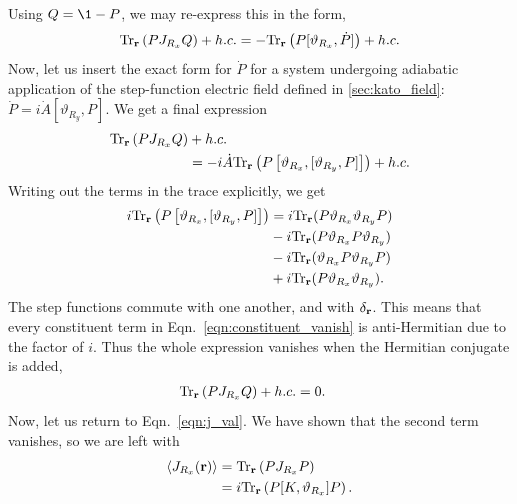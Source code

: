 Using $Q = \1-P$, we may re-express this in the form,
\begin{align}
    \textup{Tr} _{\textbf r} \left ( P J_{R_x}Q  \right ) + h.c. = 
    - \textup{Tr} _{\textbf r} 
    \left ( P  
    [ \vartheta_{R_x},\dot P]
    \right ) 
    + h.c.
\end{align}
Now, let us insert the exact form for $\dot P$ for a system undergoing adiabatic application of the step-function electric field defined in \textsection\ref{sec:kato_field}: $\dot P = i\dot A [\vartheta_{R_y} , P]$. We get a final expression
\begin{align}\label{eqn:constituent_vanish}
\begin{aligned}
    \textup{Tr} _{\textbf r} \left ( P J_{R_x}Q  \right ) &+ h.c.\\ &=- i \dot A \textup{Tr} _{\textbf r} 
    \left ( P  
    \left [ \vartheta_{R_x},[\vartheta_{R_y}, P]\right ]
    \right ) + h.c.
\end{aligned}
\end{align}
Writing out the terms in the trace explicitly, we get
\begin{align}
\begin{aligned}
    i\textup{Tr} _{\textbf r} 
    \left ( P  
    \left [ \vartheta_{R_x},[\vartheta_{R_y}, P]\right ]
    \right ) &= i\textup{Tr}_{\textbf{r}} (P\vartheta_{R_x}\vartheta_{R_y}P )\\
    &- i\textup{Tr}_{\textbf{r}} (P\vartheta_{R_x}P\vartheta_{R_y})\\
    &- i\textup{Tr}_{\textbf{r}} (\vartheta_{R_x}P\vartheta_{R_y}P)\\
    &+ i\textup{Tr}_{\textbf{r}} (P\vartheta_{R_x}\vartheta_{R_y}).
\end{aligned}
\end{align}
The step functions commute with one another, and with $\delta_{\textbf r}$. This means that every constituent term in Eqn.~\ref{eqn:constituent_vanish} is anti-Hermitian due to the factor of $i$. Thus the whole expression vanishes when the Hermitian conjugate is added, 
\begin{align}
    \textup{Tr} _{\textbf r} \left ( P J_{R_x}Q  \right ) &+ h.c. = 0. 
\end{align}
Now, let us return to Eqn.~\ref{eqn:j_val}. We have shown that the second term vanishes, so we are left with
\begin{align} 
    \left \langle J_{R_x}(\textbf r) \right \rangle & = \textup{Tr}_{\textbf r} 
    \left ( 
    P J_{R_x}P
    \right )\\
    &=i \textup{Tr}_{\textbf r} 
    \left ( 
    P [K, \vartheta_{R_x}] P
    \right ).
\end{align}
